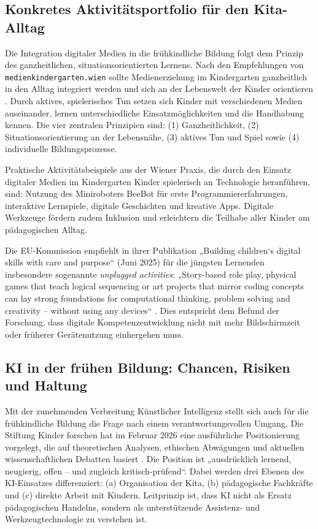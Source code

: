 \documentclass[11pt,a4paper]{article}
\begin{document}
	\subsection{Konkretes Aktivitätsportfolio für den Kita-Alltag}
	Die Integration digitaler Medien in die frühkindliche Bildung folgt dem Prinzip des ganzheitlichen, situationsorientierten Lernens. Nach den Empfehlungen von \texttt{medienkindergarten.wien} sollte Medienerziehung im Kindergarten ganzheitlich in den Alltag integriert werden und sich an der Lebenswelt der Kinder orientieren \cite{wienmedien}. Durch aktives, spielerisches Tun setzen sich Kinder mit verschiedenen Medien auseinander, lernen unterschiedliche Einsatzmöglichkeiten und die Handhabung kennen. Die vier zentralen Prinzipien sind: (1) Ganzheitlichkeit, (2) Situationsorientierung an der Lebensnähe, (3) aktives Tun und Spiel sowie (4) individuelle Bildungsprozesse.
	
	Praktische Aktivitätsbeispiele aus der Wiener Praxis, die durch den Einsatz digitaler Medien im Kindergarten Kinder spielerisch an Technologie heranführen, sind: Nutzung des Miniroboters BeeBot für erste Programmiererfahrungen, interaktive Lernspiele, digitale Geschichten und kreative Apps. Digitale Werkzeuge fördern zudem Inklusion und erleichtern die Teilhabe aller Kinder am pädagogischen Alltag.
	
	Die EU-Kommission empfiehlt in ihrer Publikation „Building children‘s digital skills with care and purpose“ (Juni 2025) für die jüngsten Lernenden insbesondere sogenannte \textit{unplugged activities}: „Story-based role play, physical games that teach logical sequencing or art projects that mirror coding concepts can lay strong foundations for computational thinking, problem solving and creativity – without using any devices“ \cite{eucomm2025b}. Dies entspricht dem Befund der Forschung, dass digitale Kompetenzentwicklung nicht mit mehr Bildschirmzeit oder früherer Gerätenutzung einhergehen muss.
	
	\subsection{KI in der frühen Bildung: Chancen, Risiken und Haltung}
	Mit der zunehmenden Verbreitung Künstlicher Intelligenz stellt sich auch für die frühkindliche Bildung die Frage nach einem verantwortungsvollen Umgang. Die Stiftung Kinder forschen hat im Februar 2026 eine ausführliche Positionierung vorgelegt, die auf theoretischen Analysen, ethischen Abwägungen und aktuellen wissenschaftlichen Debatten basiert \cite{stiftungkinder2026}. Die Position ist „ausdrücklich lernend, neugierig, offen – und zugleich kritisch-prüfend“. Dabei werden drei Ebenen des KI-Einsatzes differenziert: (a) Organisation der Kita, (b) pädagogische Fachkräfte und (c) direkte Arbeit mit Kindern. Leitprinzip ist, dass KI nicht als Ersatz pädagogischen Handelns, sondern als unterstützende Assistenz- und Werkzeugtechnologie zu verstehen ist.
	
\end{document}
